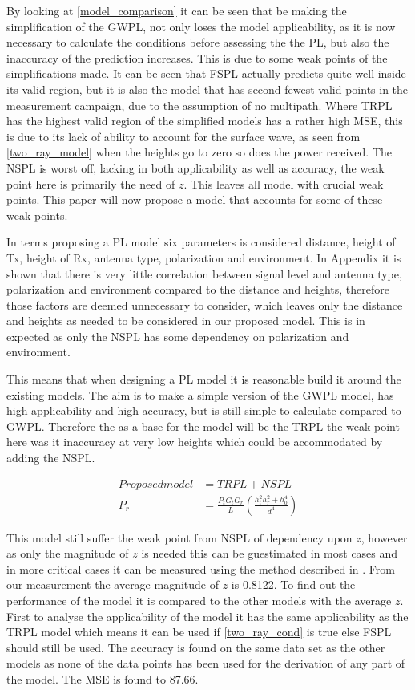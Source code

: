 
By looking at \autoref{model_comparison} it can be seen that be making the simplification of the GWPL, not only loses the model applicability, as it is now necessary to calculate the conditions before assessing the the PL, but also the inaccuracy of the prediction increases. This is due to some weak points of the simplifications made. It can be seen that FSPL actually predicts quite well inside its valid region, but it is also the model that has second fewest valid points in the measurement campaign, due to the assumption of no multipath. Where TRPL has the highest valid region of the simplified models has a rather high MSE, this is due to its lack of ability to account for the surface wave, as seen from \eqref{two_ray_model} when the heights go to zero so does the power received. The NSPL is worst off, lacking in both applicability as well as accuracy, the weak point here is primarily the need of $z$. This leaves all model with crucial weak points. This paper will now propose a model that accounts for some of these weak points. 


In terms proposing a PL model six parameters is considered distance, height of Tx, height of Rx, antenna type, polarization and environment. In Appendix it is shown that there is very little correlation between signal level and antenna type, polarization and environment compared to the distance and heights, therefore those factors are deemed unnecessary to consider, which leaves only the distance and heights as needed to be considered in our proposed model. This is in expected as only the NSPL has some dependency on polarization and environment. 

This means that when designing a PL model it is reasonable build it around the existing models. The aim is to make a simple version of the GWPL model, has high applicability and high accuracy, but is still simple to calculate compared to GWPL. Therefore the as a base for the model will be the TRPL the weak point here was it inaccuracy at very low heights which could be accommodated by adding the NSPL. 

\begin{align}
Proposed model &= TRPL + NSPL \\
P_r & = \frac{P_t G_t G_r }{L}\left(\frac{h_t^2 h_r^2+h_0^4}{d^4}\right)
\end{align}

This model still suffer the weak point from NSPL of dependency upon $z$, however as only the magnitude of $z$ is needed this can be guestimated in most cases and in more critical cases it can be measured using the method described in \cite{Kim}. From our measurement the average magnitude of $z$ is 0.8122. To find out the performance of the model it is compared to the other models with the average $z$. First to analyse the applicability of the model it has the same applicability as the TRPL model which means it can be used if \eqref{two_ray_cond} is true else FSPL should still be used. The accuracy is found on the same data set as the other models as none of the data points has been used for the derivation of any part of the model. The MSE is found to 87.66.





